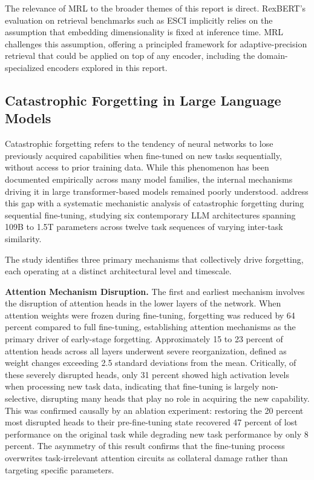 \documentclass[a4paper,12pt]{article}
\begin{document}
The relevance of MRL to the broader themes of this report is direct. RexBERT's
evaluation on retrieval benchmarks such as ESCI implicitly relies on the assumption
that embedding dimensionality is fixed at inference time. MRL challenges this
assumption, offering a principled framework for adaptive-precision retrieval that
could be applied on top of any encoder, including the domain-specialized encoders
explored in this report.

\subsection{Catastrophic Forgetting in Large Language Models}

Catastrophic forgetting refers to the tendency of neural networks to lose previously
acquired capabilities when fine-tuned on new tasks sequentially, without access to
prior training data. While this phenomenon has been documented empirically across
many model families, the internal mechanisms driving it in large transformer-based
models remained poorly understood. \citet{imanov2026mechanistic} address this gap
with a systematic mechanistic analysis of catastrophic forgetting during sequential
fine-tuning, studying six contemporary LLM architectures spanning 109B to 1.5T
parameters across twelve task sequences of varying inter-task similarity.

The study identifies three primary mechanisms that collectively drive forgetting,
each operating at a distinct architectural level and timescale.

\textbf{Attention Mechanism Disruption.} The first and earliest mechanism involves
the disruption of attention heads in the lower layers of the network. When attention
weights were frozen during fine-tuning, forgetting was reduced by 64 percent compared
to full fine-tuning, establishing attention mechanisms as the primary driver of
early-stage forgetting. Approximately 15 to 23 percent of attention heads across all
layers underwent severe reorganization, defined as weight changes exceeding 2.5
standard deviations from the mean. Critically, of these severely disrupted heads,
only 31 percent showed high activation levels when processing new task data, indicating
that fine-tuning is largely non-selective, disrupting many heads that play no role
in acquiring the new capability. This was confirmed causally by an ablation
experiment: restoring the 20 percent most disrupted heads to their pre-fine-tuning
state recovered 47 percent of lost performance on the original task while degrading
new task performance by only 8 percent. The asymmetry of this result confirms that
the fine-tuning process overwrites task-irrelevant attention circuits as collateral
damage rather than targeting specific parameters.
\end{document}
